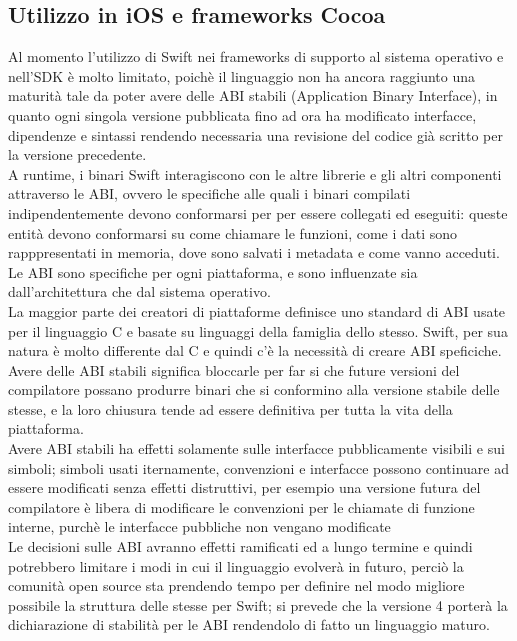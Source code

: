 \subsection{Utilizzo in iOS e frameworks Cocoa}
Al momento l'utilizzo di Swift nei frameworks di supporto al sistema operativo e nell'SDK è molto limitato, poichè il linguaggio non ha ancora raggiunto una maturità tale da poter avere delle ABI stabili (Application Binary Interface), in quanto ogni singola versione pubblicata fino ad ora ha modificato interfacce, dipendenze e sintassi rendendo necessaria una revisione del codice già scritto per la versione precedente.\\
A runtime, i binari Swift interagiscono con le altre librerie e gli altri componenti attraverso le ABI, ovvero le specifiche alle quali i binari compilati indipendentemente devono conformarsi per per essere collegati ed eseguiti: queste entità devono conformarsi su come chiamare le funzioni, come i dati sono rapppresentati in memoria, dove sono salvati i metadata e come vanno acceduti.\\
Le ABI sono specifiche per ogni piattaforma, e sono influenzate sia dall'architettura che dal sistema operativo.\\La maggior parte dei creatori di piattaforme definisce uno standard di ABI usate per il linguaggio C e basate su linguaggi della famiglia dello stesso. Swift, per sua natura è molto differente dal C e quindi c'è la necessità di creare ABI speficiche.\\
Avere delle ABI stabili significa bloccarle per far si che future versioni del compilatore possano produrre binari che si conformino alla versione stabile delle stesse, e la loro chiusura tende ad essere definitiva per tutta la vita della piattaforma.\\
Avere ABI stabili ha effetti solamente sulle interfacce pubblicamente visibili e sui simboli; simboli usati iternamente, convenzioni e interfacce possono continuare ad essere modificati senza effetti distruttivi, per esempio una versione futura del compilatore è libera di modificare le convenzioni per le chiamate di funzione interne, purchè le interfacce pubbliche non vengano modificate\\
Le decisioni sulle ABI avranno effetti ramificati ed a lungo termine e quindi potrebbero limitare i modi in cui il linguaggio evolverà in futuro, perciò la comunità open source sta prendendo tempo per definire nel modo migliore possibile la struttura delle stesse per Swift; si prevede che la versione 4 porterà la dichiarazione di stabilità per le ABI rendendolo di fatto un linguaggio maturo.